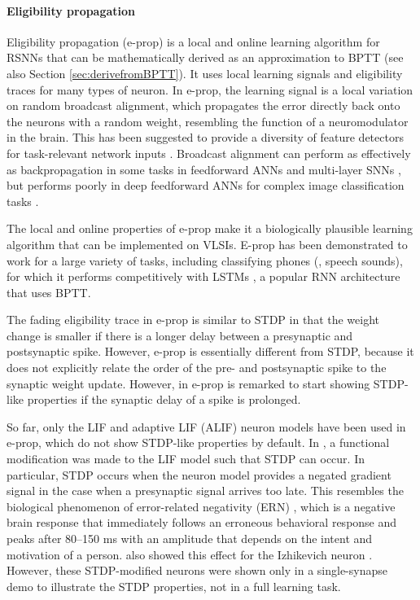 \paragraph{Eligibility propagation}
Eligibility propagation (e-prop) \citep{bellec2020solution} is a local and online learning algorithm for RSNNs that can be mathematically derived as an approximation to BPTT (see also Section \ref{sec:derivefromBPTT}).
It uses local learning signals and eligibility traces for many types of neuron.
In e-prop, the learning signal is a local variation on random broadcast alignment, which propagates the error directly back onto the neurons with a random weight, resembling the function of a neuromodulator in the brain.
This has been suggested to provide a diversity of feature detectors for task-relevant network inputs \citep{bellec2020solution}.
Broadcast alignment can perform as effectively as backpropagation in some tasks in feedforward ANNs \citep{lillicrap2016random,nokland2016direct} and multi-layer SNNs \citep{samadi2017deep,clopath2010connectivity}, but performs poorly in deep feedforward ANNs for complex image classification tasks \citep{bartunov2018assessing}.

The local and online properties of e-prop make it a biologically plausible learning algorithm that can be implemented on VLSIs.
E-prop has been demonstrated to work for a large variety of tasks, including classifying phones (\ie, speech sounds), for which it performs competitively with LSTMs \citep{graves2013speech}, a popular RNN architecture that uses BPTT.

The fading eligibility trace in e-prop is similar to STDP in that the weight change is smaller if there is a longer delay between a presynaptic and postsynaptic spike.
However, e-prop is essentially different from STDP, because it does not explicitly relate the order of the pre- and postsynaptic spike to the synaptic weight update.
However, in \citet{bellec2020solution} e-prop is remarked to start showing STDP-like properties if the synaptic delay of a spike is prolonged.

So far, only the LIF and adaptive LIF (ALIF) neuron models have been used in e-prop, which do not show STDP-like properties by default.
In \citet{traub2020learning}, a functional modification was made to the LIF model such that STDP can occur.
In particular, STDP occurs when the neuron model provides a negated gradient signal in the case when a presynaptic signal arrives too late.
This resembles the biological phenomenon of error-related negativity (ERN) \citep{nieuwenhuis2001error}, which is a negative brain response that immediately follows an erroneous behavioral response and peaks after 80--150 ms with an amplitude that depends on the intent and motivation of a person.
\citet{traub2020learning} also showed this effect for the Izhikevich neuron \citep{izhikevich2003simple}.
However, these STDP-modified neurons were shown only in a single-synapse demo to illustrate the STDP properties, not in a full learning task.

